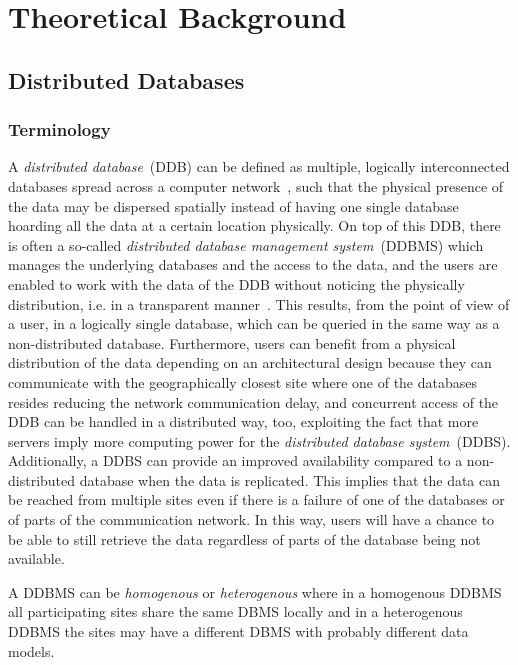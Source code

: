 
\section{Theoretical Background}
\label{sec:theo}

\subsection{Distributed Databases}
\label{sec:theo_ddb}

\subsubsection{Terminology}
\label{sec:theo_ddb_term}
A \emph{distributed database}~(DDB) can be defined as multiple, logically interconnected databases spread across a computer network~\cite[p.~4]{Ozsu1991}, such 
that the physical presence of the data may be dispersed spatially instead of having one single database hoarding all the data at a certain location physically. 
On top of this DDB, there is often a so-called \emph{distributed database management system}~(DDBMS) which manages the underlying databases and the access to the
data, and the users are enabled to work with the data of the DDB without noticing the physically distribution, i.e. in a transparent 
manner~\cite[p.~4f.]{Ozsu1991}.
This results, from the point of view of a user, in a logically single database, which can be queried in the same way as a non-distributed database. Furthermore, 
users can benefit from a physical distribution of the data depending on an architectural design because they can communicate with the geographically closest site 
where one of the databases resides reducing the network communication delay, and concurrent access of the DDB can be handled in a distributed way, too, exploiting 
the fact that more servers imply more computing power for the \emph{distributed database system}~(DDBS). Additionally, a DDBS can provide an improved availability
compared to a non-distributed database when the data is replicated. This implies that the data can be reached from multiple sites even if there is a failure of one
of the databases or of parts of the communication network. In this way, users will have a chance to be able to still retrieve the data regardless of parts of the
database being not available.


A DDBMS can be \emph{homogenous} or \emph{heterogenous} where in a homogenous DDBMS all participating sites share the same DBMS locally and in a heterogenous
DDBMS the sites may have a different DBMS with probably different data models. 


